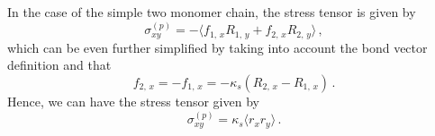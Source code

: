 \documentclass[../../main.tex]{subfiles}
\begin{document}
    In the case of the simple two monomer chain, the stress tensor is given by
        \begin{equation}
             \sigma^{(p)}_{xy} = -\langle f_{1,\,x} R_{1, \,y} + f_{2,\,x} R_{2, \,y} \rangle \,,
        \end{equation}
    which can be even further simplified by taking into account the bond vector definition and that 
    \begin{equation}
        f_{2,\,x} = -f_{1,\,x} = -\kappa_s(R_{2,\,x} - R_{1,\,x}) \,.
    \end{equation}
    Hence, we can have the stress tensor given by
        \begin{equation}
            \sigma^{(p)}_{xy} = \kappa_s\langle r_x r_y \rangle \,.
        \end{equation}
    
\end{document}

